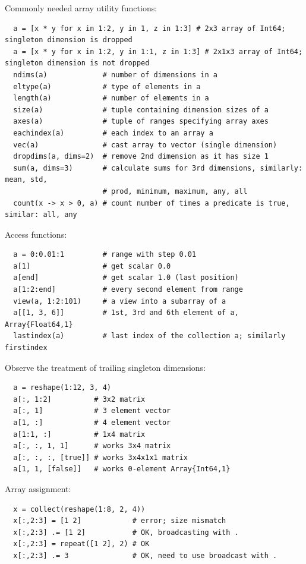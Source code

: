 \documentclass[10pt,a4paper]{article}
\begin{document}
Commonly needed array utility functions:
\begin{lstlisting}
  a = [x * y for x in 1:2, y in 1, z in 1:3] # 2x3 array of Int64; singleton dimension is dropped
  a = [x * y for x in 1:2, y in 1:1, z in 1:3] # 2x1x3 array of Int64; singleton dimension is not dropped
  ndims(a)             # number of dimensions in a
  eltype(a)            # type of elements in a
  length(a)            # number of elements in a
  size(a)              # tuple containing dimension sizes of a
  axes(a)              # tuple of ranges specifying array axes
  eachindex(a)         # each index to an array a
  vec(a)               # cast array to vector (single dimension)
  dropdims(a, dims=2)  # remove 2nd dimension as it has size 1
  sum(a, dims=3)       # calculate sums for 3rd dimensions, similarly: mean, std,
                       # prod, minimum, maximum, any, all
  count(x -> x > 0, a) # count number of times a predicate is true, similar: all, any
\end{lstlisting}

Access functions:
\begin{lstlisting}
  a = 0:0.01:1         # range with step 0.01
  a[1]                 # get scalar 0.0
  a[end]               # get scalar 1.0 (last position)
  a[1:2:end]           # every second element from range
  view(a, 1:2:101)     # a view into a subarray of a
  a[[1, 3, 6]]         # 1st, 3rd and 6th element of a, Array{Float64,1}
  lastindex(a)         # last index of the collection a; similarly firstindex
\end{lstlisting}

Observe the treatment of trailing singleton dimensions:
\begin{lstlisting}
  a = reshape(1:12, 3, 4)
  a[:, 1:2]          # 3x2 matrix
  a[:, 1]            # 3 element vector
  a[1, :]            # 4 element vector
  a[1:1, :]          # 1x4 matrix
  a[:, :, 1, 1]      # works 3x4 matrix
  a[:, :, :, [true]] # works 3x4x1x1 matrix
  a[1, 1, [false]]   # works 0-element Array{Int64,1}
\end{lstlisting}

Array assignment:
\begin{lstlisting}
  x = collect(reshape(1:8, 2, 4))
  x[:,2:3] = [1 2]            # error; size mismatch
  x[:,2:3] .= [1 2]           # OK, broadcasting with .
  x[:,2:3] = repeat([1 2], 2) # OK
  x[:,2:3] .= 3               # OK, need to use broadcast with .
\end{lstlisting}
\end{document}
